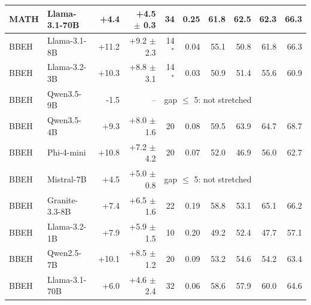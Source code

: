 \begin{tabular}{ll rr rr rrrr}
MATH & Llama-3.1-70B & +4.4 & +4.5 $\pm$ 0.3 & 34 & 0.25 & 61.8 & 62.5 & 62.3 & 66.3 \\
\midrule
BBEH & Llama-3.1-8B & +11.2 & +9.2 $\pm$ 2.3 & 14$^*$ & 0.04 & 55.1 & 50.8 & 61.8 & 66.3 \\
BBEH & Llama-3.2-3B & +10.3 & +8.8 $\pm$ 3.1 & 14$^*$ & 0.03 & 50.9 & 51.4 & 55.6 & 60.9 \\
BBEH & Qwen3.5-9B & -1.5 & -- & \multicolumn{6}{l}{gap $\le$ 5: not stretched} \\
BBEH & Qwen3.5-4B & +9.3 & +8.0 $\pm$ 1.6 & 20 & 0.08 & 59.5 & 63.9 & 64.7 & 68.7 \\
BBEH & Phi-4-mini & +10.8 & +7.2 $\pm$ 4.2 & 20 & 0.07 & 52.0 & 46.9 & 56.0 & 62.7 \\
BBEH & Mistral-7B & +4.5 & +5.0 $\pm$ 0.8 & \multicolumn{6}{l}{gap $\le$ 5: not stretched} \\
BBEH & Granite-3.3-8B & +7.4 & +6.5 $\pm$ 1.6 & 22 & 0.19 & 58.8 & 53.1 & 65.1 & 66.2 \\
BBEH & Llama-3.2-1B & +7.9 & +5.9 $\pm$ 1.5 & 10 & 0.20 & 49.2 & 52.4 & 47.7 & 57.1 \\
BBEH & Qwen2.5-7B & +10.1 & +8.5 $\pm$ 1.2 & 20 & 0.09 & 53.2 & 54.6 & 54.2 & 63.4 \\
BBEH & Llama-3.1-70B & +6.0 & +4.6 $\pm$ 2.4 & 32 & 0.06 & 58.6 & 57.9 & 60.0 & 64.6 \\
\bottomrule
\end{tabular}
